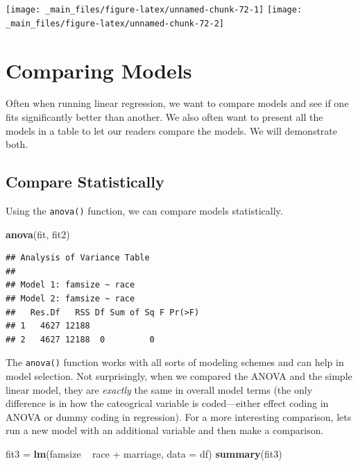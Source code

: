 \documentclass[]{tufte-book}
\newenvironment{Shaded}{}{}
\newcommand{\KeywordTok}[1]{\textcolor[rgb]{0.00,0.44,0.13}{\textbf{#1}}}
\newcommand{\DataTypeTok}[1]{\textcolor[rgb]{0.56,0.13,0.00}{#1}}
\newcommand{\StringTok}[1]{\textcolor[rgb]{0.25,0.44,0.63}{#1}}
\newcommand{\OperatorTok}[1]{\textcolor[rgb]{0.40,0.40,0.40}{#1}}
\newcommand{\NormalTok}[1]{#1}
\theoremstyle{definition}
\theoremstyle{definition}
\theoremstyle{remark}
\begin{document}
\texttt{[image: \_main\_files/figure-latex/unnamed-chunk-72-1]}
\texttt{[image: \_main\_files/figure-latex/unnamed-chunk-72-2]}

\section*{Comparing Models}\label{comparing-models}

Often when running linear regression, we want to compare models and see
if one fits significantly better than another. We also often want to
present all the models in a table to let our readers compare the models.
We will demonstrate both.

\subsection*{Compare Statistically}\label{compare-statistically}

Using the \texttt{anova()} function, we can compare models
statistically.

\begin{Shaded}
\begin{Highlighting}[]
\KeywordTok{anova}\NormalTok{(fit, fit2)}
\end{Highlighting}
\end{Shaded}

\begin{verbatim}
## Analysis of Variance Table
## 
## Model 1: famsize ~ race
## Model 2: famsize ~ race
##   Res.Df   RSS Df Sum of Sq F Pr(>F)
## 1   4627 12188                      
## 2   4627 12188  0         0
\end{verbatim}

The \texttt{anova()} function works with all sorts of modeling schemes
and can help in model selection. Not surprisingly, when we compared the
ANOVA and the simple linear model, they are \emph{exactly} the same in
overall model terms (the only difference is in how the cateogrical
variable is coded---either effect coding in ANOVA or dummy coding in
regression). For a more interesting comparison, lets run a new model
with an additional variable and then make a comparison.

\begin{Shaded}
\begin{Highlighting}[]
\NormalTok{fit3 =}\StringTok{ }\KeywordTok{lm}\NormalTok{(famsize }\OperatorTok{~}\StringTok{ }\NormalTok{race }\OperatorTok{+}\StringTok{ }\NormalTok{marriage, }\DataTypeTok{data =}\NormalTok{ df)}
\KeywordTok{summary}\NormalTok{(fit3)}
\end{Highlighting}
\end{Shaded}
\end{document}

